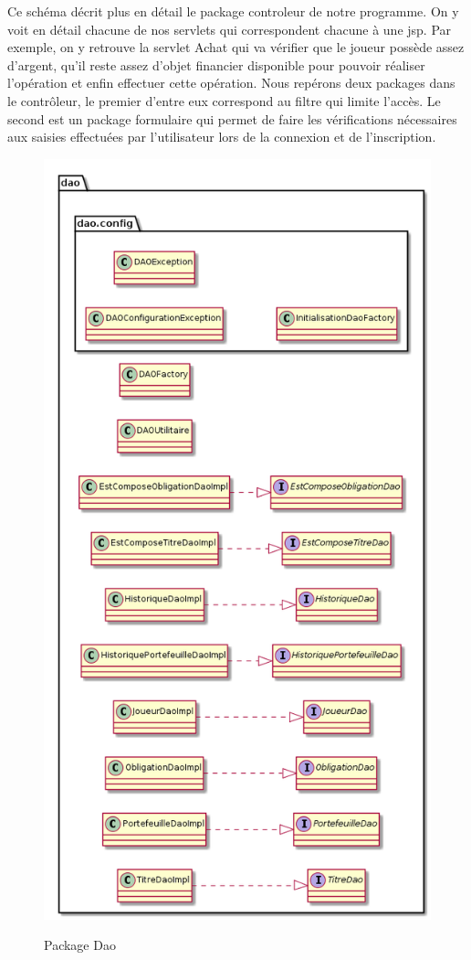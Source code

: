 Ce schéma décrit plus en détail le package controleur de notre programme. On y voit en détail chacune de nos servlets qui correspondent chacune à une jsp. Par exemple, on y retrouve la servlet Achat qui va vérifier que le joueur possède assez d'argent, qu'il reste assez d'objet financier disponible pour pouvoir réaliser l'opération et enfin effectuer cette opération. Nous repérons deux packages dans le contrôleur, le premier d'entre eux correspond au filtre qui limite l'accès. Le second est un package formulaire qui permet de faire les vérifications nécessaires aux saisies effectuées par l'utilisateur lors de la connexion et de l'inscription. 
\begin{figure}[H]
  \center
  \includegraphics[scale=0.35]{../graph/packageDAO.png} \\
  \caption{Package Dao}
\end{figure}

